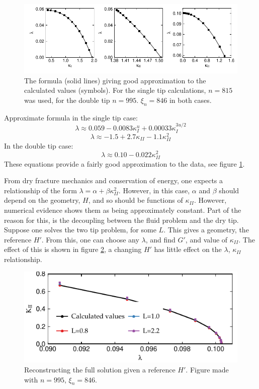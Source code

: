 \documentclass{jfm}
\begin{document}
\begin{figure}
 \centerline{
\includegraphics{./../../Graphs/overall-fit.pdf}}
  \caption{The formula (solid lines) giving good approximation to the 
           calculated values (symbols). For the single tip
           calculations, $n=815$ was used, for the double tip $n=995$. 
           $\xi_n = 846$ in both cases.  }\label{fig:overall-fit}
\end{figure}
Approximate formula in the single tip case:
\begin{equation}
\lambda \approx 0.059 -0.0083 \kappa_I^u + 0.00033 \kappa_I^{3u/2}
\end{equation}
\begin{equation}
\lambda \approx -1.5 +2.7 \kappa_{II} -1.1 \kappa_{II}^2
\end{equation}
In the double tip case: 
\begin{equation}
\lambda \approx 0.10 - 0.022\kappa_{II}^2
\end{equation}
These equations provide a fairly good approximation to the data, see figure
\ref{fig:overall-fit}.

From dry fracture mechanics and conservation of energy, one expects a 
relationship of the form $\lambda = \alpha + \beta \kappa_{II}^2$. However, 
in this case, $\alpha$ and $\beta$ should depend on the geometry, $H$, and 
so should be functions of $\kappa_{II}$. However, numerical evidence shows 
them as being approximately
constant. Part of the reason for this, is the decoupling between the fluid 
problem and the dry tip. Suppose one solves the two tip problem, for some $L$. 
This gives a geometry, the reference $H'$. From this, one can choose any
$\lambda$, and find $G'$, and value of $\kappa_{II}$. The effect of this is
shown in figure \ref{fig:fixed-fluid}, a changing $H'$ has little effect
on the $\lambda$, $\kappa_{II}$ relationship.


\begin{figure}
 \centerline{
\includegraphics{./../../Graphs/fixed-fluid.pdf}}
  \caption{Reconstructing the full solution given a reference $H'$. Figure 
           made with $n=995$, $\xi_n = 846$.}\label{fig:fixed-fluid}
\end{figure}
\end{document}
